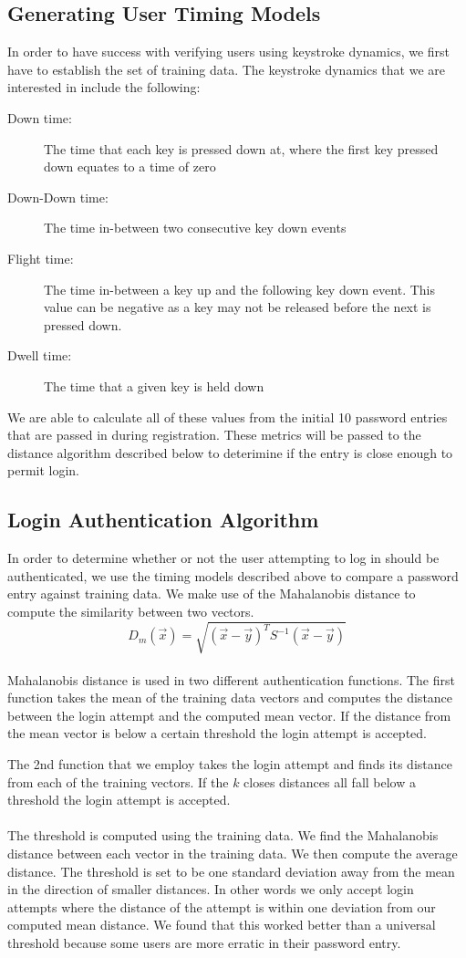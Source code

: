 \documentclass{article}
\begin{document}
\subsection{Generating User Timing Models}
In order to have success with verifying users using keystroke dynamics, we first have to establish the set of training data. The keystroke dynamics that we are interested in include the following:
\begin{description}
	\item[Down time:] The time that each key is pressed down at, where the first key pressed down equates to a time of zero
	\item[Down-Down time:] The time in-between two consecutive key down events
	\item[Flight time:] The time in-between a key up and the following key down event. This value can be negative as a key may not be released before the next is pressed down. 
	\item[Dwell time:] The time that a given key is held down
\end{description}
We are able to calculate all of these values from the initial 10 password entries that are passed in during registration. These metrics will be passed to the distance algorithm described below to deterimine if the entry is close enough to permit login.

\subsection{Login Authentication Algorithm}
In order to determine whether or not the user attempting to log in should be authenticated, we use the timing models described above to compare a password entry against training data. We make use of the Mahalanobis distance to compute the similarity between two vectors.  \\
\begin{displaymath}
D_m(\vec{x}) = \sqrt{(\vec{x}-\vec{y})^T S^{-1} (\vec{x}-\vec{y})}
\end{displaymath} \\
Mahalanobis distance is used in two different authentication functions. The first function takes the mean of the training data vectors and computes the distance between the login attempt and the computed mean vector. If the distance from the mean vector is below a certain threshold the login attempt is accepted. 

The 2nd function that we employ takes the login attempt and finds its distance from each of the training vectors. If the $k$ closes distances all fall below a threshold the login attempt is accepted. \\ \\
The threshold is computed using the training data. We find the Mahalanobis distance between each vector in the training data. We then compute the average distance. The threshold is set to be one standard deviation away from the mean in the direction of smaller distances. In other words we only accept login attempts where the distance of the attempt is within one deviation from our computed mean distance. We found that this worked better than a universal threshold because some users are more erratic in their password entry.
\end{document}
